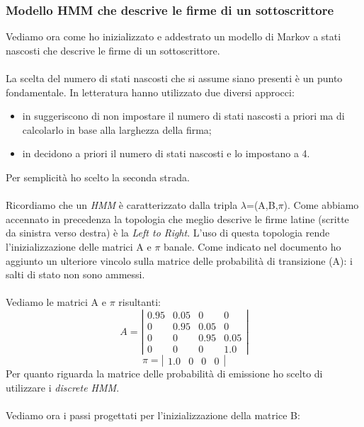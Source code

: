 \subsubsection*{Modello HMM che descrive le firme di un sottoscrittore}
\label{3.3.2.7}
Vediamo ora come ho inizializzato e addestrato un modello di Markov a stati nascosti che descrive le firme di un sottoscrittore.\\\\
La scelta del numero di stati nascosti che si assume siano presenti è un punto fondamentale. In letteratura hanno utilizzato due diversi approcci:
\begin{itemize}
\item in \cite{3} suggeriscono di non impostare il numero di stati nascosti a priori ma di calcolarlo in base alla larghezza della firma;
\item in \cite{5} decidono a priori il numero di stati nascosti e lo impostano a 4.
\end{itemize}
Per semplicità ho scelto la seconda strada.\\\\
Ricordiamo che un \emph{HMM} è caratterizzato dalla tripla $\lambda$=(A,B,$\pi$). Come abbiamo accennato in precedenza la topologia che meglio descrive le firme latine (scritte da sinistra verso destra) è la \emph{Left to Right}. L'uso di questa topologia rende l'inizializzazione delle matrici A e $\pi$ banale. Come indicato nel documento \cite{3} ho aggiunto un ulteriore vincolo sulla matrice delle probabilità di transizione (A): i salti di stato non sono ammessi.\\\\
Vediamo le matrici A e $\pi$ risultanti:
\[A=\left| \begin{array}{cccc}
0.95&0.05&0&0 \\
0&0.95&0.05&0 \\
0&0&0.95&0.05 \\
0&0&0&1.0 \end{array} \right|\]
\[\pi=\left| \begin{array}{cccc}
1.0&0&0&0 \end{array} \right|\]
Per quanto riguarda la matrice delle probabilità di emissione ho scelto di utilizzare i \emph{discrete HMM}.\\\\
Vediamo ora i passi progettati per l'inizializzazione della matrice B:

